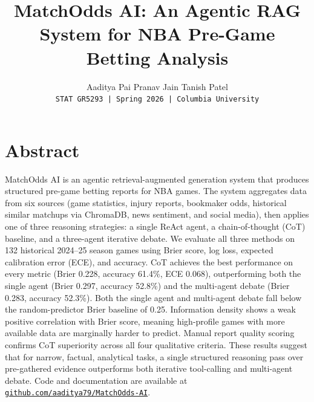 \documentclass[11pt]{article}
\title{\textbf{MatchOdds AI: An Agentic RAG System for NBA Pre-Game Betting Analysis}}
\author{
    Aaditya Pai \quad Pranav Jain \quad Tanish Patel \\
    \texttt{STAT GR5293 | Spring 2026 | Columbia University}
}
\date{}
\begin{document}
\maketitle
\vspace{-1.5em}

\section*{Abstract}
\vspace{-0.7em}
MatchOdds AI is an agentic retrieval-augmented generation system that produces structured pre-game betting reports for NBA games. The system aggregates data from six sources (game statistics, injury reports, bookmaker odds, historical similar matchups via ChromaDB, news sentiment, and social media), then applies one of three reasoning strategies: a single ReAct agent, a chain-of-thought (CoT) baseline, and a three-agent iterative debate. We evaluate all three methods on 132 historical 2024--25 season games using Brier score, log loss, expected calibration error (ECE), and accuracy. CoT achieves the best performance on every metric (Brier 0.228, accuracy 61.4\%, ECE 0.068), outperforming both the single agent (Brier 0.297, accuracy 52.8\%) and the multi-agent debate (Brier 0.283, accuracy 52.3\%). Both the single agent and multi-agent debate fall below the random-predictor Brier baseline of 0.25. Information density shows a weak positive correlation with Brier score, meaning high-profile games with more available data are marginally harder to predict. Manual report quality scoring confirms CoT superiority across all four qualitative criteria. These results suggest that for narrow, factual, analytical tasks, a single structured reasoning pass over pre-gathered evidence outperforms both iterative tool-calling and multi-agent debate. Code and documentation are available at \href{https://github.com/aaditya79/MatchOdds-AI}{\texttt{github.com/aaditya79/MatchOdds-AI}}.
\end{document}
